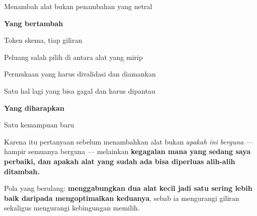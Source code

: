 \documentclass[aspectratio=169,11pt,t]{beamer}
\begin{document}
\begin{frame}[shrink=25]{Menambah alat bukan penambahan yang netral}
\begin{minipage}[t]{0.485\textwidth}
{\fontsize{9.4}{12.6}\selectfont\color{fg2}\textbf{Yang bertambah}\par}\vskip 4pt
\begin{ibullets}
\item Token skema, tiap giliran
\item Peluang salah pilih di antara alat yang mirip
\item Permukaan yang harus divalidasi dan diamankan
\item Satu hal lagi yang bisa gagal dan harus dipantau
\end{ibullets}

\end{minipage}%
\hfill
\begin{minipage}[t]{0.485\textwidth}
{\fontsize{9.4}{12.6}\selectfont\color{fg2}\textbf{Yang diharapkan}\par}\vskip 4pt
\begin{ibullets}
\item Satu kemampuan baru
\end{ibullets}

\end{minipage}%
{\fontsize{9.4}{12.6}\selectfont\color{fg2}Karena itu pertanyaan sebelum menambahkan alat bukan \textit{apakah ini berguna} --- hampir semuanya berguna --- melainkan \textbf{kegagalan mana yang sedang saya perbaiki, dan apakah alat yang sudah ada bisa diperluas alih-alih ditambah.}\par}\vskip 4pt
\begin{iband}[signal]
Pola yang berulang: \textbf{menggabungkan dua alat kecil jadi satu sering lebih baik daripada mengoptimalkan keduanya}, sebab ia mengurangi giliran sekaligus mengurangi kebingungan memilih.
\end{iband}
\end{frame}

\end{document}
